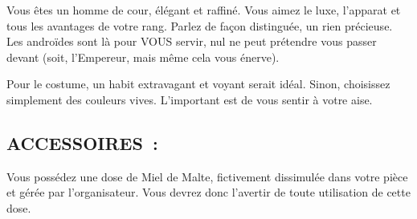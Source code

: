 \documentclass[14pt,twocolumn]{extarticle}
\begin{document}
Vous êtes un homme de cour, élégant et raffiné. Vous aimez le luxe, l’apparat
et tous les avantages de votre rang. Parlez de façon distinguée, un rien
précieuse. Les androïdes sont là pour VOUS servir, nul ne peut prétendre vous
passer devant (soit, l’Empereur, mais même cela vous énerve).

Pour le costume, un habit extravagant et voyant serait idéal. Sinon, choisissez
simplement des couleurs vives. L’important est de vous sentir à votre aise.

\subsection{ACCESSOIRES~:}

Vous possédez une dose de Miel de Malte, fictivement dissimulée dans votre
pièce et gérée par l'organisateur. Vous devrez donc l'avertir de toute
utilisation de cette dose.
\end{document}
